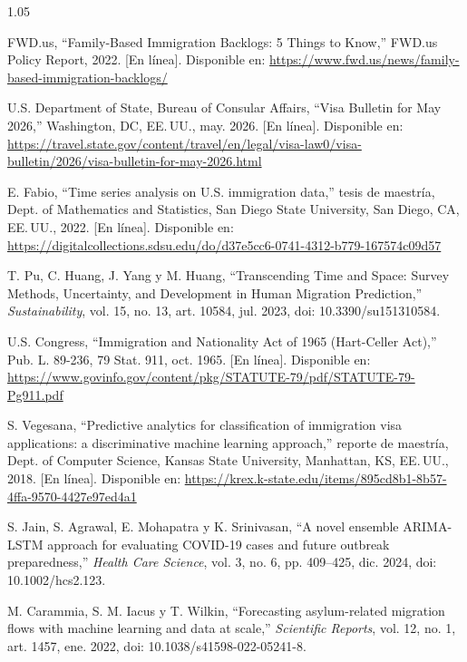 \documentclass[12pt,letterpaper]{report}
\begin{document}
\begin{spacing}{1.05}
\begin{enumerate}[label={[\arabic*]}, leftmargin=0.9cm, labelsep=0.3cm, itemsep=4pt, parsep=0pt, topsep=0pt]
    \item \label{bib:6} FWD.us, ``Family-Based Immigration Backlogs: 5 Things to Know,'' FWD.us Policy Report, 2022. [En línea]. Disponible en: \url{https://www.fwd.us/news/family-based-immigration-backlogs/}

    \item \label{bib:7} U.S. Department of State, Bureau of Consular Affairs, ``Visa Bulletin for May 2026,'' Washington, DC, EE.\,UU., may. 2026. [En línea]. Disponible en: \url{https://travel.state.gov/content/travel/en/legal/visa-law0/visa-bulletin/2026/visa-bulletin-for-may-2026.html}

    \item \label{bib:8} E. Fabio, ``Time series analysis on U.S. immigration data,'' tesis de maestría, Dept. of Mathematics and Statistics, San Diego State University, San Diego, CA, EE.\,UU., 2022. [En línea]. Disponible en: \url{https://digitalcollections.sdsu.edu/do/d37e5cc6-0741-4312-b779-167574c09d57}

    \item \label{bib:9} T. Pu, C. Huang, J. Yang y M. Huang, ``Transcending Time and Space: Survey Methods, Uncertainty, and Development in Human Migration Prediction,'' \textit{Sustainability}, vol. 15, no. 13, art. 10584, jul. 2023, doi: 10.3390/su151310584.

    \item \label{bib:10} U.S. Congress, ``Immigration and Nationality Act of 1965 (Hart-Celler Act),'' Pub. L. 89-236, 79 Stat. 911, oct. 1965. [En línea]. Disponible en: \url{https://www.govinfo.gov/content/pkg/STATUTE-79/pdf/STATUTE-79-Pg911.pdf}

    \item \label{bib:11} S. Vegesana, ``Predictive analytics for classification of immigration visa applications: a discriminative machine learning approach,'' reporte de maestría, Dept. of Computer Science, Kansas State University, Manhattan, KS, EE.\,UU., 2018. [En línea]. Disponible en: \url{https://krex.k-state.edu/items/895cd8b1-8b57-4ffa-9570-4427e97ed4a1}

    \item \label{bib:12} S. Jain, S. Agrawal, E. Mohapatra y K. Srinivasan, ``A novel ensemble ARIMA-LSTM approach for evaluating COVID-19 cases and future outbreak preparedness,'' \textit{Health Care Science}, vol. 3, no. 6, pp. 409--425, dic. 2024, doi: 10.1002/hcs2.123.

    \item \label{bib:13} M. Carammia, S. M. Iacus y T. Wilkin, ``Forecasting asylum-related migration flows with machine learning and data at scale,'' \textit{Scientific Reports}, vol. 12, no. 1, art. 1457, ene. 2022, doi: 10.1038/s41598-022-05241-8.


\end{enumerate}
\end{spacing}
\end{document}
